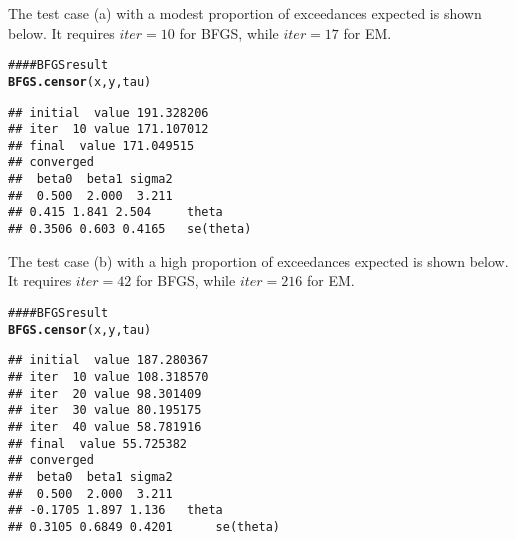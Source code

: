 \documentclass{article}\usepackage{graphicx, color}
\makeatletter
\newcommand{\hlfunctioncall}[1]{\textcolor[rgb]{0.501960784313725,0,0.329411764705882}{\textbf{#1}}}%
\newcommand{\hlcomment}[1]{\textcolor[rgb]{0.180392156862745,0.6,0.341176470588235}{#1}}%
\newenvironment{kframe}{%
 \def\at@end@of@kframe{}%
 \ifinner\ifhmode%
  \def\at@end@of@kframe{\end{minipage}}%
  \begin{minipage}{\columnwidth}%
 \fi\fi%
 \def\FrameCommand##1{\hskip\@totalleftmargin \hskip-\fboxsep
 \colorbox{shadecolor}{##1}\hskip-\fboxsep
     \hskip-\linewidth \hskip-\@totalleftmargin \hskip\columnwidth}%
 \MakeFramed {\advance\hsize-\width
   \@totalleftmargin\z@ \linewidth\hsize
   \@setminipage}}%
 {\par\unskip\endMakeFramed%
 \at@end@of@kframe}
\newenvironment{knitrout}{}{} %
\makeatother
\begin{document}
The test case (a) with a modest proportion of exceedances expected is shown below. It requires $iter=10$ for BFGS, while $iter=17$ for EM.
\begin{knitrout}
\color{fgcolor}\begin{kframe}
\begin{alltt}
\hlcomment{#### BFGS result}
\hlfunctioncall{BFGS.censor}(x, y, tau)
\end{alltt}
\end{kframe}
\end{knitrout}

\newpage
\begin{knitrout}
\color{fgcolor}\begin{kframe}
\begin{verbatim}
## initial  value 191.328206 
## iter  10 value 171.107012
## final  value 171.049515 
## converged
##  beta0  beta1 sigma2 
##  0.500  2.000  3.211 
## 0.415 1.841 2.504 	 theta 
## 0.3506 0.603 0.4165 	 se(theta)
\end{verbatim}
\end{kframe}
\end{knitrout}


The test case (b) with a high proportion of exceedances expected is shown below. It requires $iter=42$ for BFGS, while $iter=216$ for EM.
\begin{knitrout}
\color{fgcolor}\begin{kframe}
\begin{alltt}
\hlcomment{#### BFGS result}
\hlfunctioncall{BFGS.censor}(x, y, tau)
\end{alltt}
\end{kframe}
\end{knitrout}

\begin{knitrout}
\color{fgcolor}\begin{kframe}
\begin{verbatim}
## initial  value 187.280367 
## iter  10 value 108.318570
## iter  20 value 98.301409
## iter  30 value 80.195175
## iter  40 value 58.781916
## final  value 55.725382 
## converged
##  beta0  beta1 sigma2 
##  0.500  2.000  3.211 
## -0.1705 1.897 1.136 	 theta 
## 0.3105 0.6849 0.4201 	 se(theta)
\end{verbatim}
\end{kframe}
\end{knitrout}
\end{document}
